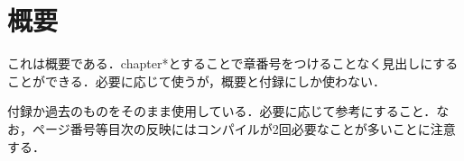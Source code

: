 \chapter*{概要}
これは概要である．chapter*とすることで章番号をつけることなく見出しにすることができる．必要に応じて使うが，概要と付録にしか使わない．\par
付録か過去のものをそのまま使用している．必要に応じて参考にすること．なお，ページ番号等目次の反映にはコンパイルが2回必要なことが多いことに注意する．